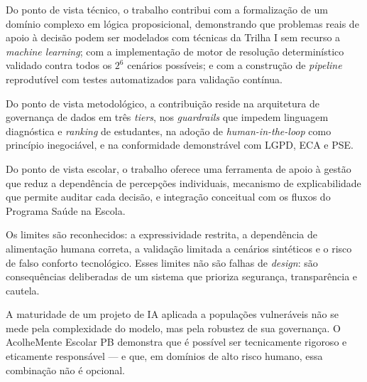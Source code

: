 \documentclass[
    12pt,
    openright,
    oneside,
    a4paper,
    english,
    brazil
]{abntex2}
\begin{document}
Do ponto de vista técnico, o trabalho contribui com a formalização de um domínio complexo em lógica proposicional, demonstrando que problemas reais de apoio à decisão podem ser modelados com técnicas da Trilha I sem recurso a \textit{machine learning}; com a implementação de motor de resolução determinístico validado contra todos os $2^6$ cenários possíveis; e com a construção de \textit{pipeline} reprodutível com testes automatizados para validação contínua.

Do ponto de vista metodológico, a contribuição reside na arquitetura de governança de dados em três \textit{tiers}, nos \textit{guardrails} que impedem linguagem diagnóstica e \textit{ranking} de estudantes, na adoção de \textit{human-in-the-loop} como princípio inegociável, e na conformidade demonstrável com LGPD, ECA e PSE.

Do ponto de vista escolar, o trabalho oferece uma ferramenta de apoio à gestão que reduz a dependência de percepções individuais, mecanismo de explicabilidade que permite auditar cada decisão, e integração conceitual com os fluxos do Programa Saúde na Escola.

Os limites são reconhecidos: a expressividade restrita, a dependência de alimentação humana correta, a validação limitada a cenários sintéticos e o risco de falso conforto tecnológico. Esses limites não são falhas de \textit{design}: são consequências deliberadas de um sistema que prioriza segurança, transparência e cautela.

A maturidade de um projeto de IA aplicada a populações vulneráveis não se mede pela complexidade do modelo, mas pela robustez de sua governança. O AcolheMente Escolar PB demonstra que é possível ser tecnicamente rigoroso e eticamente responsável --- e que, em domínios de alto risco humano, essa combinação não é opcional.



\end{document}
